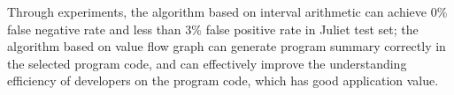 \begin{abstract*}
Through experiments, the algorithm based on interval arithmetic can achieve 0\% false negative rate and less than 3\% false positive rate in Juliet test set; the algorithm based on value flow graph can generate program summary correctly in the selected program code, and can effectively improve the understanding efficiency of developers on the program code, which has good application value.



\end{abstract*}

